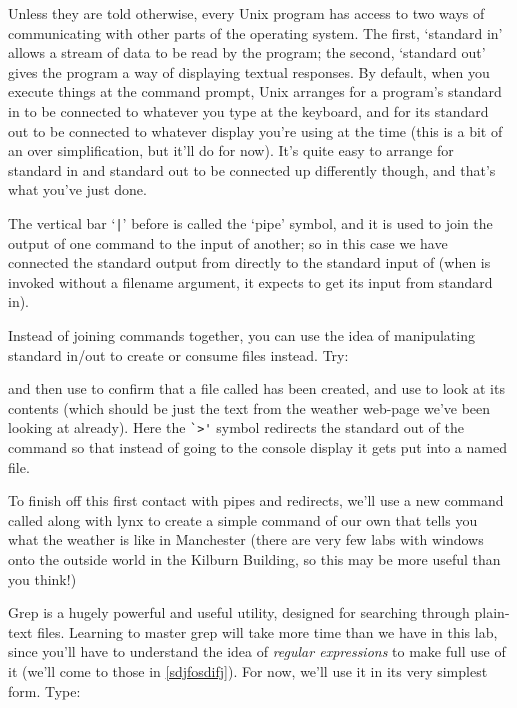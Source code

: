Unless they are told otherwise, every Unix program has access to two ways of communicating with other parts of the operating system. The first, `standard in' allows a stream of data to be read by the program; the second, `standard out' gives the program a way of displaying textual responses. By default, when you execute things at the command prompt, Unix arranges for a program's standard in to be connected to whatever you type at the keyboard, and for its standard out to be connected to whatever display you're using at the time (this is a bit of an over simplification, but it'll do for now). It's quite easy to arrange for standard in and standard out to be connected up differently though, and that's what you've just done.

The vertical bar `\verb-|-' before  is called the `pipe' symbol, and it is used to join the output of one command to the input of another; so in this case we have connected the standard output from  directly to the standard input of  (when  is invoked without a filename argument, it expects to get its input from standard in). 

Instead of joining commands together, you can use the idea of manipulating standard in/out to create or consume files instead. Try:


and then use  to confirm that a file called  has been created, and use  to look at its contents (which should be just the text from the weather web-page we've been looking at already). Here the \verb-`>'- symbol redirects the standard out of the  command so that instead of going to the console display it gets put into a named file. 

To finish off this first contact with pipes and redirects, we'll use a new command called  along with lynx to create a simple command of our own that tells you what the weather is like in Manchester (there are very few labs with windows onto the outside world in the Kilburn Building, so this may be more useful than you think!) 

Grep is a hugely powerful and useful utility, designed for searching through plain-text files. Learning to master grep will take more time than we have in this lab, since you'll have to understand the idea of \textit{regular expressions} to make full use of it (we'll come to those in \ref{sdjfosdifj}). For now, we'll use it in its very simplest form. Type:

